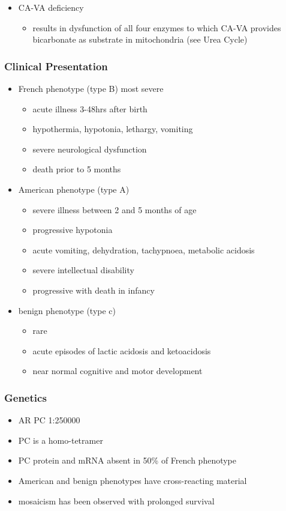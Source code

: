\documentclass{scrartcl}
\begin{document}
\begin{itemize}
\begin{itemize}
\item CA-VA deficiency
\begin{itemize}
\item results in dysfunction of all four enzymes to which CA-VA
provides bicarbonate as substrate in mitochondria (see Urea Cycle)
\end{itemize}
\end{itemize}
\end{itemize}

\subsubsection{Clinical Presentation}
\label{sec:org0126c68}
\begin{itemize}
\item French phenotype (type B) most severe
\begin{itemize}
\item acute illness 3-48hrs after birth
\item hypothermia, hypotonia, lethargy, vomiting
\item severe neurological dysfunction
\item death prior to 5 months
\end{itemize}
\item American phenotype (type A)
\begin{itemize}
\item severe illness between 2 and 5 months of age
\item progressive hypotonia
\item acute vomiting, dehydration, tachypnoea, metabolic acidosis
\item severe intellectual disability
\item progressive with death in infancy
\end{itemize}
\item benign phenotype (type c)
\begin{itemize}
\item rare
\item acute episodes of lactic acidosis and ketoacidosis
\item near normal cognitive and motor development
\end{itemize}
\end{itemize}
\subsubsection{Genetics}
\label{sec:org5b408a6}
\begin{itemize}
\item AR PC 1:250000
\item PC is a homo-tetramer
\item PC protein and mRNA absent in 50\% of French phenotype
\item American and benign phenotypes have cross-reacting material
\item mosaicism has been observed with prolonged survival
\end{itemize}
\end{document}
